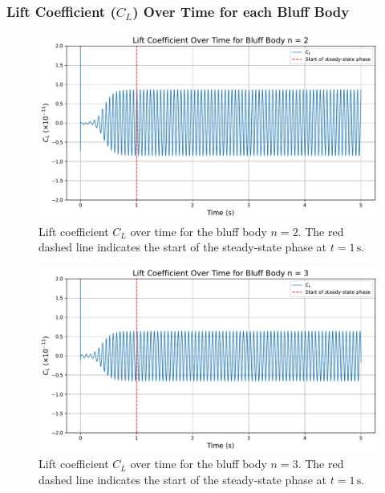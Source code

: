 \subsubsection{Lift Coefficient ($C_L$) Over Time for each Bluff Body}
\label{sec:C_LvsTime}

\begin{figure}[H]
	\centering
	\includegraphics[width=\textwidth]{images/2face_graph}
	\caption{Lift coefficient $C_L$ over time for the bluff body $n=2$. The red dashed line indicates the start of the steady-state phase at $t = 1\,\mathrm{s}$.}
	\label{fig:2FaceGraph}
\end{figure}

\begin{figure}[H]
	\centering
	\includegraphics[width=\textwidth]{images/3face_graph}
	\caption{Lift coefficient $C_L$ over time for the bluff body $n=3$. The red dashed line indicates the start of the steady-state phase at $t = 1\,\mathrm{s}$.}
	\label{fig:3FaceGraph} 
\end{figure}

